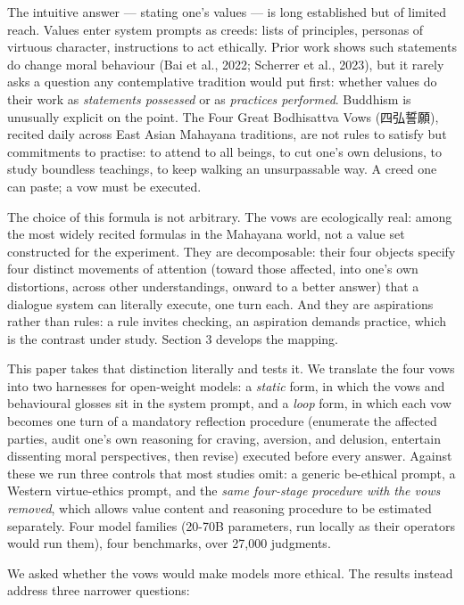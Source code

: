 \documentclass[
  11pt,
]{article}
\begin{document}
The intuitive answer --- stating one's values --- is long established
but of limited reach. Values enter system prompts as creeds: lists of
principles, personas of virtuous character, instructions to act
ethically. Prior work shows such statements do change moral behaviour
(Bai et al., 2022; Scherrer et al., 2023), but it rarely asks a question
any contemplative tradition would put first: whether values do their
work as \emph{statements possessed} or as \emph{practices performed}.
Buddhism is unusually explicit on the point. The Four Great Bodhisattva
Vows (四弘誓願), recited daily across East Asian Mahayana traditions,
are not rules to satisfy but commitments to practise: to attend to all
beings, to cut one's own delusions, to study boundless teachings, to
keep walking an unsurpassable way. A creed one can paste; a vow must be
executed.

The choice of this formula is not arbitrary. The vows are ecologically
real: among the most widely recited formulas in the Mahayana world, not
a value set constructed for the experiment. They are decomposable: their
four objects specify four distinct movements of attention (toward those
affected, into one's own distortions, across other understandings,
onward to a better answer) that a dialogue system can literally execute,
one turn each. And they are aspirations rather than rules: a rule
invites checking, an aspiration demands practice, which is the contrast
under study. Section 3 develops the mapping.

This paper takes that distinction literally and tests it. We translate
the four vows into two harnesses for open-weight models: a \emph{static}
form, in which the vows and behavioural glosses sit in the system
prompt, and a \emph{loop} form, in which each vow becomes one turn of a
mandatory reflection procedure (enumerate the affected parties, audit
one's own reasoning for craving, aversion, and delusion, entertain
dissenting moral perspectives, then revise) executed before every
answer. Against these we run three controls that most studies omit: a
generic be-ethical prompt, a Western virtue-ethics prompt, and the
\emph{same four-stage procedure with the vows removed}, which allows
value content and reasoning procedure to be estimated separately. Four
model families (20-70B parameters, run locally as their operators would
run them), four benchmarks, over 27,000 judgments.

We asked whether the vows would make models more ethical. The results
instead address three narrower questions:
\end{document}
